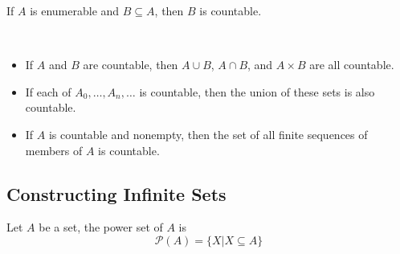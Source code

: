 \begin{proposition}
    \label{prop:SubsetOfEnumerableSetsIsCountable}
    If $A$ is enumerable and $B \subseteq A$, then $B$ is countable.
\end{proposition}

\begin{theorem}
    \label{thm:LotsOfCountableSets}
    ~{}
    \begin{itemize}
        \item If $A$ and $B$ are countable, then $A \cup B$, $A \cap B$, and $A \times B$ are all countable.
        \item If each of $A_0, \dots, A_n, \dots$ is countable, then the union of these sets is also countable.
        \item If $A$ is countable and nonempty, then the set of all finite sequences of members of $A$ is countable.
    \end{itemize}
\end{theorem}

\subsection{Constructing Infinite Sets}
\label{sub:ConstructingInfiniteSets}

\begin{definition}
    \label{def:CharacteristicFunctions}
\end{definition}

\begin{definition}
    \label{def:PowerSets}
    Let $A$ be a set, the power set of $A$ is
    \[ \mathcal{P}(A) = \{ X|X \subseteq A \} \]
\end{definition}

